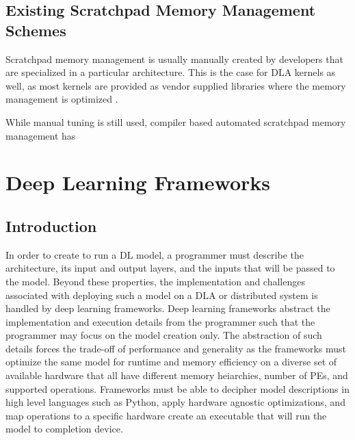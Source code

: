 \subsection{Existing Scratchpad Memory Management Schemes}
Scratchpad memory management is usually manually created by developers
that are specialized in a particular architecture. This is the case for
DLA kernels as well, as most kernels are provided as vendor supplied libraries
where the memory management is optimized \cite{TVM}.

While manual tuning is still used, compiler based automated scratchpad
memory management has 

\section{Deep Learning Frameworks}
\subsection{Introduction}
In order to create to run a DL model, a programmer must describe the
architecture, its input and output layers, and the inputs that will be passed
to the model. Beyond these properties, the implementation and challenges
associated with deploying such a model on a DLA or distributed system is
handled by deep learning frameworks. Deep learning frameworks abstract the
implementation and execution details from the programmer such that the
programmer may focus on the model creation only. The abstraction of such
details forces the trade-off of performance and generality as the frameworks
must optimize the same model for runtime and memory efficiency on a diverse set
of available hardware that all have different memory heiarchies, number of PEs,
and supported operations. Frameworks must be able to decipher model
descriptions in high level languages such as Python, apply hardware agnostic
optimizations, and map operations to a specific hardware create an executable
that will run the model to completion device.

